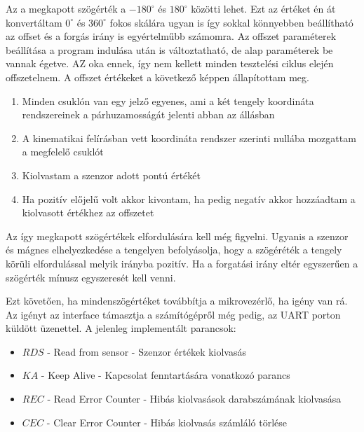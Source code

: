 
Az a megkapott szögérték a $-180^\circ$ és $180^\circ$ közötti lehet. Ezt az értéket én át konvertáltam $0^\circ$ és $360^\circ$ fokos skálára ugyan is így sokkal könnyebben beállítható az offset és a forgás irány is egyértelműbb számomra. Az offszet paraméterek beállítása a program indulása után is változtatható, de alap paraméterek be vannak égetve. AZ oka ennek, így nem kellett minden tesztelési ciklus elején offszetelnem. A offszet értékeket a következő képpen állapítottam meg.

\begin{enumerate}
  \item Minden csuklón van egy jelző egyenes, ami a két tengely koordináta rendszereinek a párhuzamosságát jelenti abban az állásban
  \item A kinematikai felírásban vett koordináta rendszer szerinti nullába mozgattam a megfelelő csuklót
  \item Kiolvastam a szenzor adott pontú értékét
  \item Ha pozitív előjelű volt akkor kivontam, ha pedig negatív akkor hozzáadtam a kiolvasott értékhez az offszetet
\end{enumerate}

Az így megkapott szögértékek elfordulására kell még figyelni. Ugyanis a szenzor és mágnes elhelyezkedése a tengelyen befolyásolja, hogy a szögéréték a tengely körüli elfordulással melyik irányba pozitív. Ha a forgatási irány eltér egyszerűen a szögérték mínusz egyszeresét kell venni. 

Ezt követően, ha mindenszögértéket továbbítja a mikrovezérlő, ha igény van rá. Az igényt az interface támasztja a számítógépről még pedig, az UART porton küldött üzenettel. A jelenleg implementált parancsok:

\begin{itemize}
\item $RDS$ - Read from sensor - Szenzor értékek kiolvasás 
\item $KA$ - Keep Alive - Kapcsolat fenntartására vonatkozó parancs
\item $REC$ - Read Error Counter - Hibás kiolvasások darabszámának kiolvasása
\item $CEC$ - Clear Error Counter - Hibás kiolvasás számláló törlése
\end{itemize}


